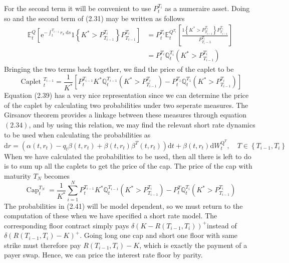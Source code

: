 \documentclass[12pt,twoside]{reedthesis}
\begin{document}
For the second term it will be convenient to use \(P_{t}^{T_{i}}\) as a numeraire asset. Doing so and the second term of (2.31) may be written as follows
\[
\begin{aligned}
\mathbb{E}_{t}^{Q}\left[\mathrm{e}^{-\int_{t}^{T_{i-1}} r_{x} \mathrm{~d} s} 1\left\{K^{*}>P_{T_{i-1}}^{T_{i}}\right\} P_{T_{i-1}}^{T_{i}}\right] &=P_{t}^{T_{i}} \mathbb{E}_{t}^{Q^{T_{i}}}\left[\frac{1\left\{K^{*}>P_{T_{i-1}}^{T_{i}}\right\} P_{T_{i-1}}^{T_{i}}}{P_{T_{i}-1}^{T_{i}}}\right] \\
&=P_{t}^{T_{i}} \mathbb{Q}_{t}^{T_{i}}\left(K^{*}>P_{T_{i-1}}^{T_{i}}\right)
\end{aligned}
\]
Bringing the two terms back together, we find the price of the caplet to be
\[
\text { Caplet }_{t}^{T_{i-1}}=\frac{1}{K^{*}}\left[P_{t}^{T_{i-1}} K^{*} \mathbb{Q}_{t}^{T_{i-1}}\left(K^{*}>P_{T_{i-1}}^{T_{i}}\right)-P_{t}^{T_{1}} \mathbb{Q}_{t}^{T_{1}}\left(K^{*}>P_{T_{i-1}}^{T_{i}}\right)\right]
\]
Equation (2.39) has a very nice representation since we can determine the price of the caplet by calculating two probabilities under two seperate measures. The Girsanov theorem provides a linkage between these measures through equation \((2.34)\), and by using this relation, we may find the relevant short rate dynamics to be used when calculating the probabilities as
\[
\mathrm{d} r=\left(\alpha\left(t, r_{t}\right)-q_{t} \beta\left(t, r_{t}\right)+\beta\left(t, r_{t}\right) \beta^{T}\left(t, r_{t}\right)\right) \mathrm{d} t+\beta\left(t, r_{t}\right) \mathrm{d} W_{t}^{\mathrm{Q}^{T}}, \quad T \in\left\{T_{i-1}, T_{i}\right\}
\]
When we have calculated the probabilities to be used, then all there is left to do is to sum up all the caplets to get the price of the cap. The price of the cap with maturity \(T_{N}\) becomes
\[
\operatorname{Cap}_{t}^{T_{N}}=\frac{1}{K^{*}} \sum_{i=1}^{N} P_{t}^{T_{i-1}} K^{*} \mathbb{Q}_{t}^{T_{i-1}}\left(K^{*}>P_{T_{i-1}}^{T_{i}}\right)-P_{t}^{T} \mathbb{Q}_{t}^{T_{i}}\left(K^{*}>P_{T_{i-1}}^{T_{i}}\right)
\]
The probabilities in (2.41) will be model dependent, so we must return to the computation of these when we have specified a short rate model. The corresponding floor contract simply pays \(\delta\left(K-R\left(T_{i-1}, T_{i}\right)\right)^{+}\)instead of \(\delta\left(R\left(T_{i-1}, T_{i}\right)-K\right)^{+}\). Going long one cap and short one floor with same strike must therefore pay \(R\left(T_{i-1}, T_{i}\right)-K\), which is exactly the payment of a payer swap. Hence, we can price the interest rate floor by parity.
\end{document}
